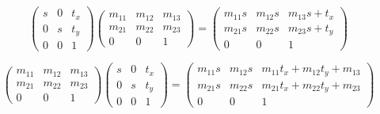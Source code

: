 

\begin{equation}
\left(\begin{array}{ccc}
    s & 0 & t_x \\
    0 & s & t_y \\
    0 & 0 & 1
\end{array}\right)
\left(\begin{array}{ccc}
    m_{11} & m_{12} & m_{13} \\
    m_{21} & m_{22} & m_{23} \\
    0 & 0 & 1
\end{array}\right)
=
\left(\begin{array}{ccc}
    m_{11} s & m_{12} s & m_{13} s + t_x \\
    m_{21} s & m_{22} s & m_{23} s + t_y \\
    0 & 0 & 1
\end{array}\right)
\end{equation}


\begin{equation}
\left(\begin{array}{ccc}
    m_{11} & m_{12} & m_{13} \\
    m_{21} & m_{22} & m_{23} \\
    0 & 0 & 1
\end{array}\right)
\left(\begin{array}{ccc}
    s & 0 & t_x \\
    0 & s & t_y \\
    0 & 0 & 1
\end{array}\right)
=
\left(\begin{array}{ccc}
    m_{11} s & m_{12} s & m_{11} t_x + m_{12} t_y + m_{13} \\
    m_{21} s & m_{22} s & m_{21} t_x + m_{22} t_y + m_{23} \\
    0 & 0 & 1
\end{array}\right)
\end{equation}
